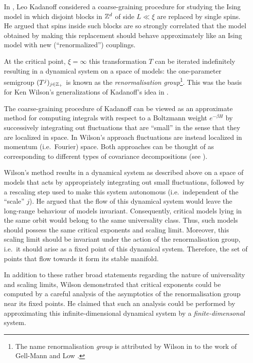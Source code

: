 In \cite{Kada66}, Leo Kadanoff considered a coarse-graining procedure for
studying the Ising model in which disjoint
blocks in ${ {{\mathbb Z}}^d }$ of side $L \ll \xi$ are replaced by single spins. He argued
that spins inside such blocks are so strongly correlated that the model
obtained by making this replacement should behave approximately like an Ising
model with new (``renormalized'') couplings.

At the critical point, $\xi = \infty$ this transformation
$T$ can be iterated indefinitely resulting in a dynamical system on a space
of models: the one-parameter semigroup $(T^j)_{j\in{\mathbb Z}_+}$ is known as the
\emph{renormalisation group}\footnote{The name
renormalisation \emph{group} is attributed by Wilson in \cite{Wils71I}
to the work of Gell-Mann and Low \cite{GML54}.}. This was the basis for Ken Wilson's
generalizations of Kadanoff's idea in \cite{Wils71I,Wils71II}.

The coarse-graining procedure of Kadanoff can be viewed as an approximate
method for computing integrals with respect to a Boltzmann weight $e^{-\beta H}$
by successively integrating out fluctuations that are ``small'' in the sense
that they are localized in space. In Wilson's approach fluctuations are instead
localized in momentum (i.e.\ Fourier) space. Both approaches can be thought of
as corresponding to different types of covariance decompositions (see \cite{BCGNOPS78}).

Wilson's method results in a dynamical system as described above on a space of
models that acts by appropriately integrating out small fluctuations, followed
by a rescaling step used to make this system autonomous (i.e.\ independent of
the ``scale'' $j$). He argued that the flow of this dynamical system would
leave the long-range behaviour of models invariant. Consequently, critical models
lying in the same orbit would belong to
the same universality class. Thus, such models should possess the same critical
exponents and scaling limit. Moreover, this scaling limit should be invariant
under the action of the renormalisation group, i.e.\ it should arise as a fixed
point of this dynamical system. Therefore, the set of points that flow towards it
form its stable manifold.

In addition to these rather broad statements regarding the nature of universality
and scaling limits, Wilson demonstrated that critical exponents could be computed
by a careful analysis of the asymptotics of the renormalisation group near its
fixed points. He claimed that such an analysis could be performed by approximating
this infinite-dimensional dynamical system by a \emph{finite-dimensonal} system.

